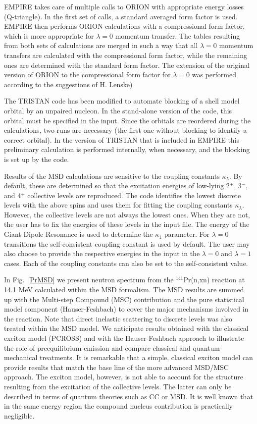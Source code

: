 EMPIRE takes care of multiple calls to ORION%
 with appropriate energy losses (Q-triangle). In the first set
of calls, a standard averaged form factor is used. EMPIRE then performs ORION
calculations with a compressional form factor, which is more appropriate
for $\lambda=0$ momentum transfer. The tables resulting from both sets of
calculations are merged in such a way that all $\lambda=0$ momentum
transfers are calculated with the compressional form factor, while the
remaining ones are determined with the standard form factor. The extension
of the original version of ORION to the compressional form factor for $%
\lambda=0$ was performed according to the suggestions of H. Lenske)

The TRISTAN%
 code has been modified to automate blocking of a shell
model orbital by an unpaired nucleon. In the stand-alone version of the
code, this orbital must be specified in the input. Since the orbitals are
reordered during the calculations, two runs are necessary (the first one
without blocking to identify a correct orbital). In the version of TRISTAN
that is included in EMPIRE this preliminary calculation is performed
internally, when necessary, and the blocking is set up by the code.

Results of the MSD%
 calculations are sensitive to the coupling constants $%
\kappa_{\lambda}$. By default, these are determined so that the excitation
energies of low-lying 2$^{+}$, 3$^{-}$, and 4$^{+}$ collective levels are
reproduced. The code identifies the lowest discrete levels with the above
spins and uses them for fitting the coupling constants $\kappa_{\lambda}$.
However, the collective levels are not always the lowest ones. When
they are not, the user has to fix the
energies of these levels in the input file.
The energy of the Giant Dipole Resonance is used to determine the $%
\kappa_{1} $ parameter. For $\lambda=0$ transitions the self-consistent
coupling constant is used by default. The user may also choose to provide
the respective energies in the input in the $\lambda=0$ and $\lambda=1$
cases. Each
of the coupling constants can also be set to the self-consistent value.

In Fig.~\ref{PrMSD} we present neutron spectrum from the $^{141}$Pr(n,xn)
reaction at 14.1 MeV calculated within the MSD formalism. The MSD results
are summed up with the Multi-step Compound (MSC) contribution and the pure
statistical model component (Hauser-Feshbach) to cover the major mechanisms
involved in the reaction. Note that direct inelastic scattering to discrete
levels was also treated within the MSD model. We anticipate results obtained
with the classical exciton model (PCROSS) and with the Hauser-Feshbach
approach to illustrate the role of preequilibrium emission and compare
classical and quantum-mechanical treatments. It is remarkable that a simple,
classical exciton model can provide results that match the base line of the
more advanced MSD/MSC approach. The exciton model, however, is not able to
account for the structure resulting from the excitation of the collective
levels. The latter can only be described in terms of quantum theories such
as CC or MSD. It is well known that in the same energy region the compound
nucleus contribution is practically negligible.

